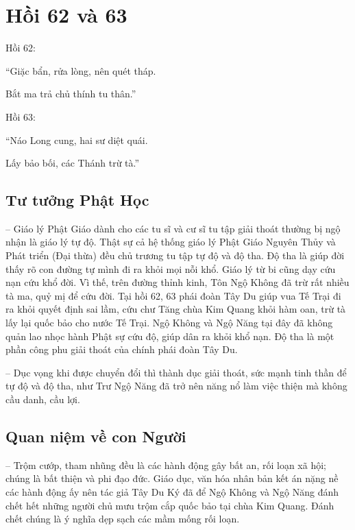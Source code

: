 \chapter{Hồi 62 và 63} %
\label{cha:hoi_62_63}

Hồi 62:

\begin{itshape}
``Giặc bẩn, rửa lòng, nên quét tháp.

Bắt ma trả chủ thính tu thân.''
\end{itshape}

Hồi 63:

\begin{itshape}
``Náo Long cung, hai sư diệt quái.

Lấy bảo bối, các Thánh trừ tà.''
\end{itshape}

\section{Tư tưởng Phật Học} %
\label{sec:62_63_phat_hoc}

-- Giáo lý Phật Giáo dành cho các tu sĩ và cư sĩ tu tập giải thoát thường bị ngộ nhận là giáo lý tự độ. Thật sự cả hệ thống giáo lý Phật Giáo Nguyên Thủy và Phát triển (Đại thừa) đều chủ trương tu tập tự độ và độ tha. Độ tha là giúp đời thấy rõ con đường tự mình đi ra khỏi mọi nỗi khổ. Giáo lý từ bi cũng dạy cứu nạn cứu khổ đời. Vì thế, trên đường thỉnh kinh, Tôn Ngộ Không đã trừ rất nhiều tà ma, quỷ mị để cứu đời. Tại hồi 62, 63 phái đoàn Tây Du giúp vua Tế Trại đi ra khỏi quyết định sai lầm, cứu chư Tăng chùa Kim Quang khỏi hàm oan, trừ tà lấy lại quốc bảo cho nước Tế Trại. Ngộ Không và Ngộ Năng tại đây đã không quản lao nhọc hành Phật sự cứu độ, giúp dân ra khỏi khổ nạn. Độ tha là một phần công phu giải thoát của chính phái đoàn Tây Du.

-- Dục vọng khi được chuyển đổi thì thành dục giải thoát, sức mạnh tinh thần để tự độ và độ tha, như Trư Ngộ Năng đã trở nên năng nổ làm việc thiện mà không cầu danh, cầu lợi.

\section{Quan niệm về con Người} %
\label{sec:62_63_con_nguoi}

-- Trộm cướp, tham nhũng đều là các hành động gây bất an, rối loạn xã hội; chúng là bất thiện và phi đạo đức. Giáo dục, văn hóa nhân bản kết án nặng nề các hành động ấy nên tác giả Tây Du Ký đã để Ngộ Không và Ngộ Năng đánh chết hết những người chủ mưu trộm cắp quốc bảo tại chùa Kim Quang. Đánh chết chúng là ý nghĩa dẹp sạch các mầm mống rối loạn.

